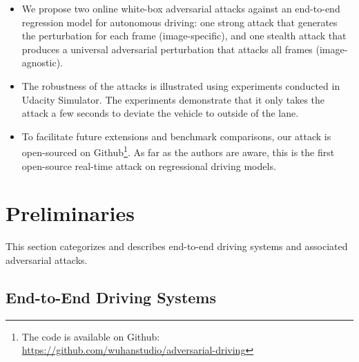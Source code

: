 \begin{itemize}
    \item We propose two online white-box adversarial attacks against     an end-to-end regression model for autonomous driving: one strong attack that generates the perturbation for each frame (image-specific), and one stealth attack that produces a universal adversarial perturbation that attacks all frames (image-agnostic).
    \item The robustness of the attacks is illustrated using experiments conducted in Udacity Simulator. 
    The experiments demonstrate that it only takes the attack a few seconds to deviate the vehicle to outside of the lane.
    \item To facilitate future extensions and benchmark comparisons, our attack is open-sourced on Github\footnote{The code is available on Github: \url{https://github.com/wuhanstudio/adversarial-driving}}. As far as the authors are aware, this is the first open-source real-time attack on regressional driving models.
\end{itemize}


\section{Preliminaries}


This section categorizes and describes end-to-end driving systems and associated adversarial attacks.

\subsection{End-to-End Driving Systems}


